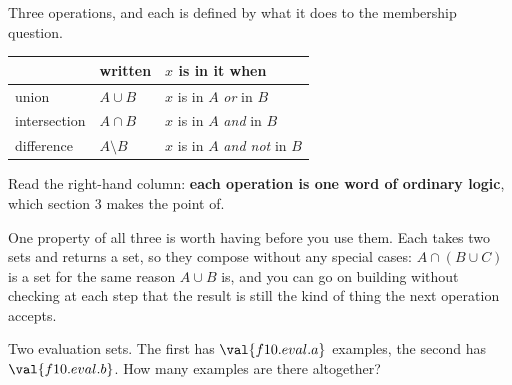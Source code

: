 \begin{fr}
Three operations, and each is defined by what it does to the membership
question.

\begin{center}
\begin{tabular}{lll}
\toprule
& written & $x$ is in it when \\
\midrule
union & $A \cup B$ & $x$ is in $A$ \emph{or} in $B$ \\
intersection & $A \cap B$ & $x$ is in $A$ \emph{and} in $B$ \\
difference & $A \setminus B$ & $x$ is in $A$ \emph{and not} in $B$ \\
\bottomrule
\end{tabular}
\end{center}

Read the right-hand column: \textbf{each operation is one word of ordinary
logic}, which section 3 makes the point of.

One property of all three is worth having before you use them. Each takes two
sets and returns a set, so they compose without any special cases:
$A \cap (B \cup C)$ is a set for the same reason $A \cup B$ is, and you can go
on building without checking at each step that the result is still the kind of
thing the next operation accepts.

Two evaluation sets. The first has $\val{f10.eval.a}$ examples, the second has
$\val{f10.eval.b}$. How many examples are there altogether?
\dotline
\nextframe
\end{fr}

